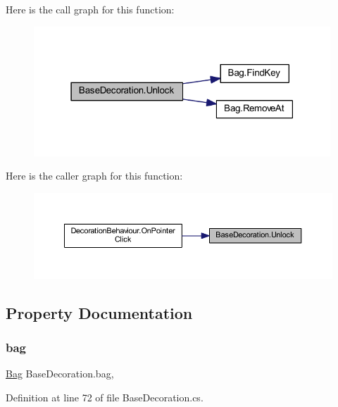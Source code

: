 Here is the call graph for this function\+:
\nopagebreak
\begin{figure}[H]
\begin{center}
\leavevmode
\includegraphics[width=316pt]{class_base_decoration_a820de02d0bb917f7cee59a4759da6251_cgraph}
\end{center}
\end{figure}
Here is the caller graph for this function\+:
\nopagebreak
\begin{figure}[H]
\begin{center}
\leavevmode
\includegraphics[width=350pt]{class_base_decoration_a820de02d0bb917f7cee59a4759da6251_icgraph}
\end{center}
\end{figure}


\subsection{Property Documentation}
\mbox{\label{class_base_decoration_ac89ba4289b6d0b80d564aeb969615a3f}} 
\subsubsection{\texorpdfstring{bag}{bag}}
{\footnotesize\ttfamily \mbox{\hyperlink{class_bag}{Bag}} Base\+Decoration.\+bag\hspace{0.3cm}{\ttfamily [get]}, {\ttfamily [set]}}



Definition at line 72 of file Base\+Decoration.\+cs.

